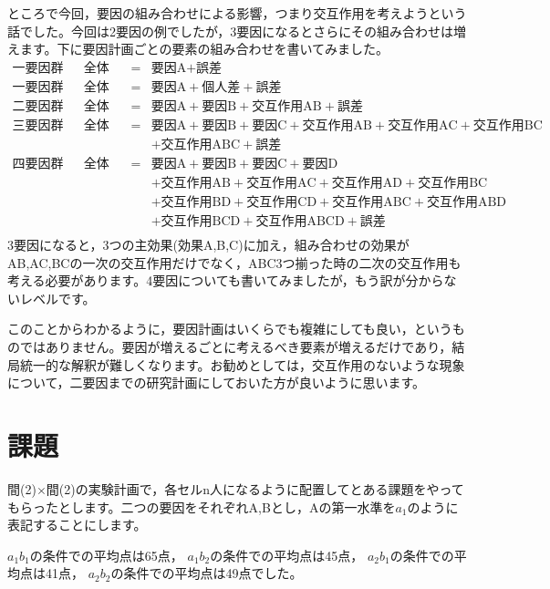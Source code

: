 \documentclass{ltjbook}
\begin{document}
ところで今回，要因の組み合わせによる影響，つまり交互作用を考えようという話でした。今回は2要因の例でしたが，3要因になるとさらにその組み合わせは増えます。下に要因計画ごとの要素の組み合わせを書いてみました。
\[
\begin{array}{llll}
\mbox{一要因群間計画} & \mbox{全体変動} &=& \mbox{要因A} + \mbox{誤差} \\
\mbox{一要因群内計画} & \mbox{全体変動} &=& \mbox{要因A} + \mbox{個人差} + \mbox{誤差}\\
 \mbox{二要因群間計画} & \mbox{全体変動} &=& \mbox{要因A} + \mbox{要因B} +\mbox{交互作用AB} +\mbox{誤差}\\
 \mbox{三要因群間計画} & \mbox{全体変動} &=& \mbox{要因A} + \mbox{要因B} + \mbox{要因C}+\mbox{交互作用AB} +\mbox{交互作用AC}+\mbox{交互作用BC} \\
 &&&+\mbox{交互作用ABC}  +\mbox{誤差}\\
 \mbox{四要因群間計画} & \mbox{全体変動} &=& \mbox{要因A} + \mbox{要因B} + \mbox{要因C} + \mbox{要因D}\\
 &&&  + \mbox{交互作用AB} +\mbox{交互作用AC} +\mbox{交互作用AD}+\mbox{交互作用BC}\\
 &&& +\mbox{交互作用BD} +\mbox{交互作用CD}+\mbox{交互作用ABC}+\mbox{交互作用ABD}\\
 &&& +\mbox{交互作用BCD} +\mbox{交互作用ABCD} +\mbox{誤差}\\
\end{array}
\]
3要因になると，3つの主効果(効果A,B,C)に加え，組み合わせの効果がAB,AC,BCの一次の交互作用だけでなく，ABC3つ揃った時の二次の交互作用も考える必要があります。4要因についても書いてみましたが，もう訳が分からないレベルです。

このことからわかるように，要因計画はいくらでも複雑にしても良い，というものではありません。要因が増えるごとに考えるべき要素が増えるだけであり，結局統一的な解釈が難しくなります。お勧めとしては，交互作用のないような現象について，二要因までの研究計画にしておいた方が良いように思います。

\section{課題}
間(2)$\times$間(2)の実験計画で，各セルn人になるように配置してとある課題をやってもらったとします。二つの要因をそれぞれA,Bとし，Aの第一水準を$a_1$のように表記することにします。

$a_1b_1$の条件での平均点は65点，
$a_1b_2$の条件での平均点は45点，
$a_2b_1$の条件での平均点は41点，
$a_2b_2$の条件での平均点は49点でした。
\end{document}
